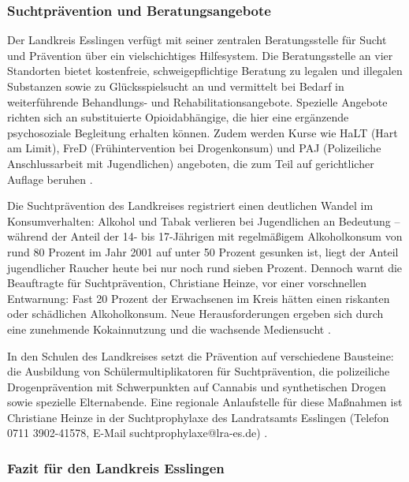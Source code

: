 \documentclass[11pt,a4paper]{article}
\begin{document}
	\subsubsection{Suchtprävention und Beratungsangebote}
	
	Der Landkreis Esslingen verfügt mit seiner zentralen Beratungsstelle für Sucht und Prävention über ein vielschichtiges Hilfesystem. Die Beratungsstelle an vier Standorten bietet kostenfreie, schweigepflichtige Beratung zu legalen und illegalen Substanzen sowie zu Glücksspielsucht an und vermittelt bei Bedarf in weiterführende Behandlungs- und Rehabilitationsangebote. Spezielle Angebote richten sich an substituierte Opioidabhängige, die hier eine ergänzende psychosoziale Begleitung erhalten können. Zudem werden Kurse wie HaLT (Hart am Limit), FreD (Frühintervention bei Drogenkonsum) und PAJ (Polizeiliche Anschlussarbeit mit Jugendlichen) angeboten, die zum Teil auf gerichtlicher Auflage beruhen \cite{esslingen-praevention}.
	
	Die Suchtprävention des Landkreises registriert einen deutlichen Wandel im Konsumverhalten: Alkohol und Tabak verlieren bei Jugendlichen an Bedeutung – während der Anteil der 14- bis 17-Jährigen mit regelmäßigem Alkoholkonsum von rund 80 Prozent im Jahr 2001 auf unter 50 Prozent gesunken ist, liegt der Anteil jugendlicher Raucher heute bei nur noch rund sieben Prozent. Dennoch warnt die Beauftragte für Suchtprävention, Christiane Heinze, vor einer vorschnellen Entwarnung: Fast 20 Prozent der Erwachsenen im Kreis hätten einen riskanten oder schädlichen Alkoholkonsum. Neue Herausforderungen ergeben sich durch eine zunehmende Kokainnutzung und die wachsende Mediensucht \cite{esslingen-praevention}.
	
	In den Schulen des Landkreises setzt die Prävention auf verschiedene Bausteine: die Ausbildung von Schülermultiplikatoren für Suchtprävention, die polizeiliche Drogenprävention mit Schwerpunkten auf Cannabis und synthetischen Drogen sowie spezielle Elternabende. Eine regionale Anlaufstelle für diese Maßnahmen ist Christiane Heinze in der Suchtprophylaxe des Landratsamts Esslingen (Telefon 0711 3902-41578, E-Mail suchtprophylaxe@lra-es.de) \cite{esslingen-kontakt}.
	
	\subsubsection{Fazit für den Landkreis Esslingen}
	
\end{document}
